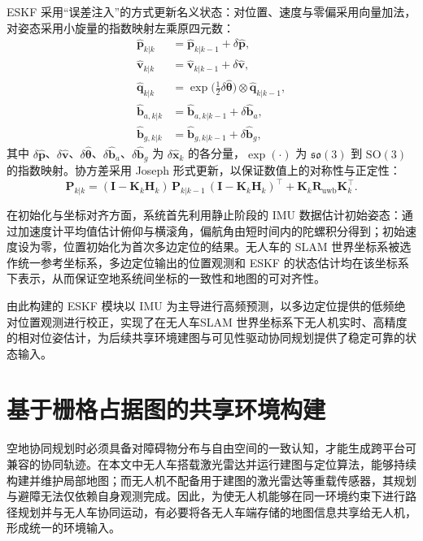 ESKF 采用“误差注入”的方式更新名义状态：对位置、速度与零偏采用向量加法，对姿态采用小旋量的指数映射左乘原四元数：
\begin{align}
    \hat{\mathbf{p}}_{k|k} &= \hat{\mathbf{p}}_{k|k-1} + \delta\hat{\mathbf{p}}, \\
    \hat{\mathbf{v}}_{k|k} &= \hat{\mathbf{v}}_{k|k-1} + \delta\hat{\mathbf{v}}, \\
    \hat{\mathbf{q}}_{k|k}
    &= 
    \exp\!\bigl(\tfrac{1}{2}\delta\hat{\boldsymbol\theta}\bigr)
    \otimes \hat{\mathbf{q}}_{k|k-1}, \\
    \hat{\mathbf{b}}_{a,k|k} &= \hat{\mathbf{b}}_{a,k|k-1} + \delta\hat{\mathbf{b}}_a, \\
    \hat{\mathbf{b}}_{g,k|k} &= \hat{\mathbf{b}}_{g,k|k-1} + \delta\hat{\mathbf{b}}_g,
    \label{eq:inject}
\end{align}
其中 $\delta\hat{\mathbf{p}}$、$\delta\hat{\mathbf{v}}$、$\delta\hat{\boldsymbol\theta}$、$\delta\hat{\mathbf{b}}_a$、$\delta\hat{\mathbf{b}}_g$ 为 $\delta\hat{\mathbf{x}}_k$ 的各分量，$\exp(\cdot)$ 为 $\mathfrak{so}(3)$ 到 $\mathrm{SO}(3)$ 的指数映射。协方差采用 Joseph 形式更新，以保证数值上的对称性与正定性：
\begin{equation}
    \mathbf{P}_{k|k}
    =
    (\mathbf{I} - \mathbf{K}_k\mathbf{H}_k)\,\mathbf{P}_{k|k-1}\,(\mathbf{I} - \mathbf{K}_k\mathbf{H}_k)^\top
    + \mathbf{K}_k \mathbf{R}_{\mathrm{uwb}} \mathbf{K}_k^\top.
    \label{eq:joseph}
\end{equation}

在初始化与坐标对齐方面，系统首先利用静止阶段的 IMU 数据估计初始姿态：通过加速度计平均值估计俯仰与横滚角，偏航角由短时间内的陀螺积分得到；初始速度设为零，位置初始化为首次多边定位的结果。无人车的 SLAM 世界坐标系被选作统一参考坐标系，多边定位输出的位置观测和 ESKF 的状态估计均在该坐标系下表示，从而保证空地系统间坐标的一致性和地图的可对齐性。

由此构建的 ESKF 模块以 IMU 为主导进行高频预测，以多边定位提供的低频绝对位置观测进行校正，实现了在无人车SLAM 世界坐标系下无人机实时、高精度的相对位姿估计，为后续共享环境建图与可见性驱动协同规划提供了稳定可靠的状态输入。

\section{基于栅格占据图的共享环境构建}
\label{sec:env_share}

空地协同规划时必须具备对障碍物分布与自由空间的一致认知，才能生成跨平台可兼容的协同轨迹。在本文中无人车搭载激光雷达并运行建图与定位算法，能够持续构建并维护局部地图；而无人机不配备用于建图的激光雷达等重载传感器，其规划与避障无法仅依赖自身观测完成。因此，为使无人机能够在同一环境约束下进行路径规划并与无人车协同运动，有必要将各无人车端存储的地图信息共享给无人机，形成统一的环境输入。

